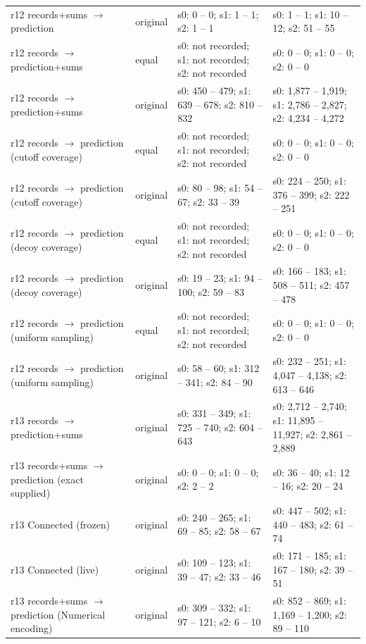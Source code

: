\begin{longtable}{@{}>{\raggedright\arraybackslash}p{1.700in}>{\raggedright\arraybackslash}p{0.400in}>{\raggedright\arraybackslash}p{2.000in}>{\raggedright\arraybackslash}p{2.000in}@{}}
r12 records+sums $\to$ prediction & original & s0: 0 -- 0; s1: 1 -- 1; s2: 1 -- 1 & s0: 1 -- 1; s1: 10 -- 12; s2: 51 -- 55 \\
r12 records $\to$ prediction+sums & equal & s0: not recorded; s1: not recorded; s2: not recorded & s0: 0 -- 0; s1: 0 -- 0; s2: 0 -- 0 \\
r12 records $\to$ prediction+sums & original & s0: 450 -- 479; s1: 639 -- 678; s2: 810 -- 832 & s0: 1,877 -- 1,919; s1: 2,786 -- 2,827; s2: 4,234 -- 4,272 \\
r12 records $\to$ prediction (cutoff coverage) & equal & s0: not recorded; s1: not recorded; s2: not recorded & s0: 0 -- 0; s1: 0 -- 0; s2: 0 -- 0 \\
r12 records $\to$ prediction (cutoff coverage) & original & s0: 80 -- 98; s1: 54 -- 67; s2: 33 -- 39 & s0: 224 -- 250; s1: 376 -- 399; s2: 222 -- 251 \\
r12 records $\to$ prediction (decoy coverage) & equal & s0: not recorded; s1: not recorded; s2: not recorded & s0: 0 -- 0; s1: 0 -- 0; s2: 0 -- 0 \\
r12 records $\to$ prediction (decoy coverage) & original & s0: 19 -- 23; s1: 94 -- 100; s2: 59 -- 83 & s0: 166 -- 183; s1: 508 -- 511; s2: 457 -- 478 \\
r12 records $\to$ prediction (uniform sampling) & equal & s0: not recorded; s1: not recorded; s2: not recorded & s0: 0 -- 0; s1: 0 -- 0; s2: 0 -- 0 \\
r12 records $\to$ prediction (uniform sampling) & original & s0: 58 -- 60; s1: 312 -- 341; s2: 84 -- 90 & s0: 232 -- 251; s1: 4,047 -- 4,138; s2: 613 -- 646 \\
r13 records $\to$ prediction+sums & original & s0: 331 -- 349; s1: 725 -- 740; s2: 604 -- 643 & s0: 2,712 -- 2,740; s1: 11,895 -- 11,927; s2: 2,861 -- 2,889 \\
r13 records+sums $\to$ prediction (exact supplied) & original & s0: 0 -- 0; s1: 0 -- 0; s2: 2 -- 2 & s0: 36 -- 40; s1: 12 -- 16; s2: 20 -- 24 \\
r13 Connected (frozen) & original & s0: 240 -- 265; s1: 69 -- 85; s2: 58 -- 67 & s0: 447 -- 502; s1: 440 -- 483; s2: 61 -- 74 \\
r13 Connected (live) & original & s0: 109 -- 123; s1: 39 -- 47; s2: 33 -- 46 & s0: 171 -- 185; s1: 167 -- 180; s2: 39 -- 51 \\
r13 records+sums $\to$ prediction (Numerical encoding) & original & s0: 309 -- 332; s1: 97 -- 121; s2: 6 -- 10 & s0: 852 -- 869; s1: 1,169 -- 1,200; s2: 89 -- 110 \\

\end{longtable}
